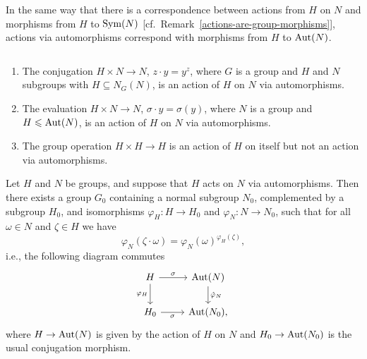 \begin{rem}\label{actions-and-automorphisms}
    In the same way that there is a correspondence between actions from\/ $H$ on\/ $N$ and morphisms from\/ $H$ to\/ ${\rm Sym}(N)$ {\rm [cf.~Remark~\ref{actions-are-group-morphisms}]}, actions via automorphisms correspond with morphisms from\/ $H$ to\/ ${\rm Aut}(N)$. 
\end{rem}

\begin{xmpls}\label{examples-action-via-automorphisms}${}$
    \begin{enumerate}[\rm i)]
        \item The conjugation\/ $H\times N\to N$, $z\cdot y=y^z$, where\/ $G$ is a group and\/ $H$ and\/ $N$ subgroups with $H\subseteq N_G(N)$,  is an action of\/ $H$ on\/ $N$ via automorphisms.

        \item The evaluation\/ $H\times N\to N$, $\sigma\cdot y=\sigma(y)$, where\/ $N$ is a group and\/ $H\leqslant{\rm Aut}(N)$, is an action of\/ $H$ on\/ $N$ via automorphisms.

        \item The group operation $H\times H\to H$ is an action of\/ $H$ on itself but not an action via automorphisms.
    \end{enumerate}
\end{xmpls}

\begin{thm}\label{semidirect-product-thm}
    Let\/\/ $H$ and\/ $N$ be groups, and suppose that\/ $H$ acts on\/ $N$ via automorphisms. Then there exists a group\/ $G_0$ containing a normal subgroup\/ $N_0$, complemented by a subgroup\/ $H_0$, and isomorphisms $\varphi_H\colon H\to H_0$ and $\varphi_N\colon N\to N_0$, such that for all\/ $\omega \in N$ and\/ $\zeta \in H$ we have
    \begin{equation}\label{eq7}
        \varphi_N(\zeta\cdot\omega) = \varphi_N(\omega)^{\varphi_H(\zeta)},
    \end{equation}
    i.e., the following diagram commutes
    $$
        \begin{tikzcd}
            H \arrow[r, "\sigma"] \arrow[d, "\varphi_H"']
                & \Aut(N) \arrow[d, "\hat{\varphi}_N"] \\
            H_0 \arrow[r, "\sigma"']
                & \Aut(N_0),
        \end{tikzcd}
    $$
    where\/ $H\to{\rm Aut}(N)$ is given by the action of\/ $H$ on\/ $N$ and\/ $H_0\to{\rm Aut}(N_0)$ is the usual conjugation morphism.
\end{thm}

